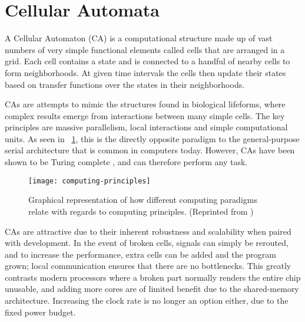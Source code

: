 
\section{Cellular Automata}

A Cellular Automaton (CA) is a computational structure made up of vast numbers of very simple functional elements called cells that are arranged in a grid.
Each cell contains a state and is connected to a handful of nearby cells to form neighborhoods.
At given time intervals the cells then update their states based on transfer functions over the states in their neighborhoods.\footnotemark


CAs are attempts to mimic the structures found in biological lifeforms, where complex results emerge from interactions between many simple cells.
The key principles are massive parallelism, local interactions and simple computational units.
As seen in \figurename~\ref{fig:computing-principles}, this is the directly opposite paradigm to the general-purpose serial architecture that is common in computers today.
However, CAs have been shown to be Turing complete \cite{codd1968cellular, neumann1966selfreplication}, and can therefore perform any task.

\begin{figure}[!ht]
    \centering
    \texttt{[image: computing-principles]}
    \caption[Computing principles]{
        Graphical representation of how different computing paradigms relate with regards to computing principles.
        (Reprinted from \cite{sipper1999emergence})
    }
    \label{fig:computing-principles}
\end{figure}

CAs are attractive due to their inherent robustness and scalability when paired with development.
In the event of broken cells, signals can simply be rerouted, and to increase the performance, extra cells can be added and the program grown; local communication ensures that there are no bottlenecks.
This greatly contrasts modern processors where a broken part normally renders the entire chip unusable, and adding more cores are of limited benefit due to the shared-memory architecture.
Increasing the clock rate is no longer an option either, due to the fixed power budget.

